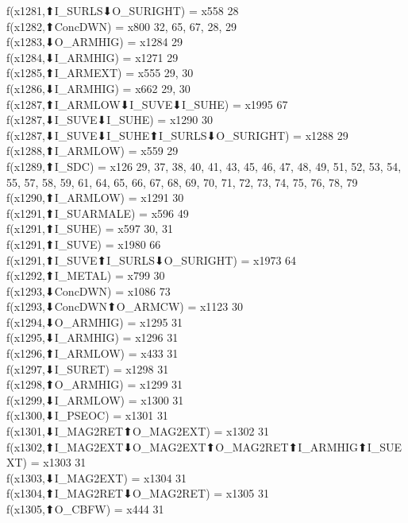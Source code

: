 f(x1281,⬆I_SURLS⬇O_SURIGHT) = x558 {28} \\
f(x1282,⬆ConcDWN) = x800 {32, 65, 67, 28, 29} \\
f(x1283,⬇O_ARMHIG) = x1284 {29} \\
f(x1284,⬇I_ARMHIG) = x1271 {29} \\
f(x1285,⬆I_ARMEXT) = x555 {29, 30} \\
f(x1286,⬇I_ARMHIG) = x662 {29, 30} \\
f(x1287,⬆I_ARMLOW⬇I_SUVE⬇I_SUHE) = x1995 {67} \\
f(x1287,⬇I_SUVE⬇I_SUHE) = x1290 {30} \\
f(x1287,⬇I_SUVE⬇I_SUHE⬆I_SURLS⬇O_SURIGHT) = x1288 {29} \\
f(x1288,⬆I_ARMLOW) = x559 {29} \\
f(x1289,⬆I_SDC) = x126 {29, 37, 38, 40, 41, 43, 45, 46, 47, 48, 49, 51, 52, 53, 54, 55, 57, 58, 59, 61, 64, 65, 66, 67, 68, 69, 70, 71, 72, 73, 74, 75, 76, 78, 79} \\
f(x1290,⬆I_ARMLOW) = x1291 {30} \\
f(x1291,⬆I_SUARMALE) = x596 {49} \\
f(x1291,⬆I_SUHE) = x597 {30, 31} \\
f(x1291,⬆I_SUVE) = x1980 {66} \\
f(x1291,⬆I_SUVE⬆I_SURLS⬇O_SURIGHT) = x1973 {64} \\
f(x1292,⬆I_METAL) = x799 {30} \\
f(x1293,⬇ConcDWN) = x1086 {73} \\
f(x1293,⬇ConcDWN⬆O_ARMCW) = x1123 {30} \\
f(x1294,⬇O_ARMHIG) = x1295 {31} \\
f(x1295,⬇I_ARMHIG) = x1296 {31} \\
f(x1296,⬆I_ARMLOW) = x433 {31} \\
f(x1297,⬇I_SURET) = x1298 {31} \\
f(x1298,⬆O_ARMHIG) = x1299 {31} \\
f(x1299,⬇I_ARMLOW) = x1300 {31} \\
f(x1300,⬇I_PSEOC) = x1301 {31} \\
f(x1301,⬇I_MAG2RET⬆O_MAG2EXT) = x1302 {31} \\
f(x1302,⬆I_MAG2EXT⬇O_MAG2EXT⬆O_MAG2RET⬆I_ARMHIG⬆I_SUEXT) = x1303 {31} \\
f(x1303,⬇I_MAG2EXT) = x1304 {31} \\
f(x1304,⬆I_MAG2RET⬇O_MAG2RET) = x1305 {31} \\
f(x1305,⬆O_CBFW) = x444 {31} \\
